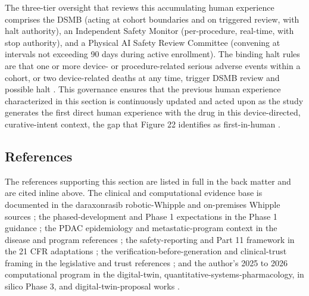 The three-tier oversight that reviews this accumulating human experience comprises
the DSMB (acting at cohort boundaries and on triggered review, with halt
authority), an Independent Safety Monitor (per-procedure, real-time, with stop
authority), and a Physical AI Safety Review Committee (convening at intervals not
exceeding 90 days during active enrollment). The binding halt rules are that one or
more device- or procedure-related serious adverse events within a cohort, or two
device-related deaths at any time, trigger DSMB review and possible halt
\cite{onpremwhippl, congress9510}. This governance ensures that the previous human
experience characterized in this section is continuously updated and acted upon as
the study generates the first direct human experience with the drug in this
device-directed, curative-intent context, the gap that Figure 22 identifies as
first-in-human \cite{clintrustpai}.

\subsection{References}

The references supporting this section are listed in full in the back matter and
are cited inline above. The clinical and computational evidence base is documented
in the daraxonrasib robotic-Whipple and on-premises Whipple sources
\cite{daraxwhipple, onpremwhippl}; the phased-development and Phase 1 expectations
in the Phase 1 guidance \cite{phase1guidance}; the PDAC epidemiology and
metastatic-program context in the disease and program references
\cite{pdac060s2030}; the safety-reporting and Part 11 framework in the 21 CFR
adaptations \cite{cfr312paiuni, cfr050paiuni, ichpaistduni}; the
verification-before-generation and clinical-trust framing in the legislative and
trust references \cite{congress9510, clintrustpai}; and the author's 2025 to 2026
computational program in the digital-twin, quantitative-systems-pharmacology,
in silico Phase 3, and digital-twin-proposal works \cite{fdadigtwinpc, qspmetpancre,
chatgpt100kp, pdacdigtwinp, llmcomp16fda}.
